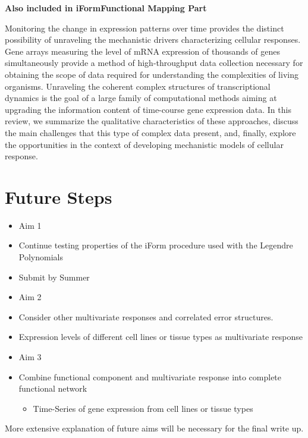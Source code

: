 \documentclass[11pt,]{book}
\providecommand{\tightlist}{%
  \setlength{\itemsep}{0pt}\setlength{\parskip}{0pt}}
\theoremstyle{definition}
\theoremstyle{definition}
\theoremstyle{remark}
\begin{document}
\textbf{Also included in iFormFunctional Mapping Part}

Monitoring the change in expression patterns over time provides the
distinct possibility of unraveling the mechanistic drivers
characterizing cellular responses. Gene arrays measuring the level of
mRNA expression of thousands of genes simultaneously provide a method of
high-throughput data collection necessary for obtaining the scope of
data required for understanding the complexities of living organisms.
Unraveling the coherent complex structures of transcriptional dynamics
is the goal of a large family of computational methods aiming at
upgrading the information content of time-course gene expression data.
In this review, we summarize the qualitative characteristics of these
approaches, discuss the main challenges that this type of complex data
present, and, finally, explore the opportunities in the context of
developing mechanistic models of cellular response.
\cite{androulakis2007analysis}

\section{Future Steps}\label{future-steps}

\begin{itemize}
\item
  Aim 1
\item
  Continue testing properties of the iForm procedure used with the
  Legendre Polynomials
\item
  Submit by Summer
\item
  Aim 2
\item
  Consider other multivariate responses and correlated error
  structures.\\
\item
  Expression levels of different cell lines or tissue types as
  multivariate response
\item
  Aim 3
\item
  Combine functional component and multivariate response into complete
  functional network

  \begin{itemize}
  \tightlist
  \item
    Time-Series of gene expression from cell lines or tissue types
  \end{itemize}
\end{itemize}

More extensive explanation of future aims will be necessary for the
final write up.
\end{document}

